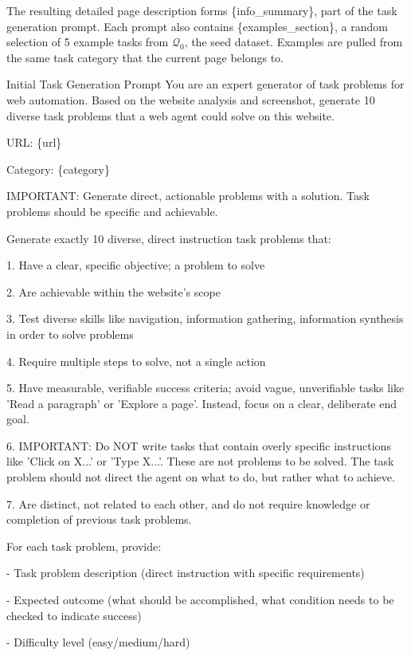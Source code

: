 \documentclass{article} %
\begin{document}
The resulting detailed page description forms \{info\_summary\}, part of the task generation prompt. Each prompt also contains \{examples\_section\}, a random selection of 5 example tasks from $\mathcal{Q}_0$, the seed dataset. Examples are pulled from the same task category that the current page belongs to.       

\begin{fancybox}{Initial Task Generation Prompt}
You are an expert generator of task problems for web automation. Based on the website analysis and screenshot, generate 10 diverse task problems that a web agent could solve on this website.

\bigskip
URL: \{url\}

Category: \{category\}

\bigskip
IMPORTANT: Generate direct, actionable problems with a solution. Task problems should be specific and achievable.

\bigskip
Generate exactly 10 diverse, direct instruction task problems that:

1. Have a clear, specific objective; a problem to solve

2. Are achievable within the website's scope

3. Test diverse skills like navigation, information gathering, information synthesis in order to solve problems

4. Require multiple steps to solve, not a single action

5. Have measurable, verifiable success criteria; avoid vague, unverifiable tasks like 'Read a paragraph' or 'Explore a page'. Instead, focus on a clear, deliberate end goal.

6. IMPORTANT: Do NOT write tasks that contain overly specific instructions like 'Click on X...' or 'Type X...'. These are not problems to be solved. The task problem should not direct the agent on what to do, but rather what to achieve.

7. Are distinct, not related to each other, and do not require knowledge or completion of previous task problems.

\bigskip
For each task problem, provide:

- Task problem description (direct instruction with specific requirements)

- Expected outcome (what should be accomplished, what condition needs to be checked to indicate success)

- Difficulty level (easy/medium/hard)

\bigskip


\end{fancybox}
\end{document}
